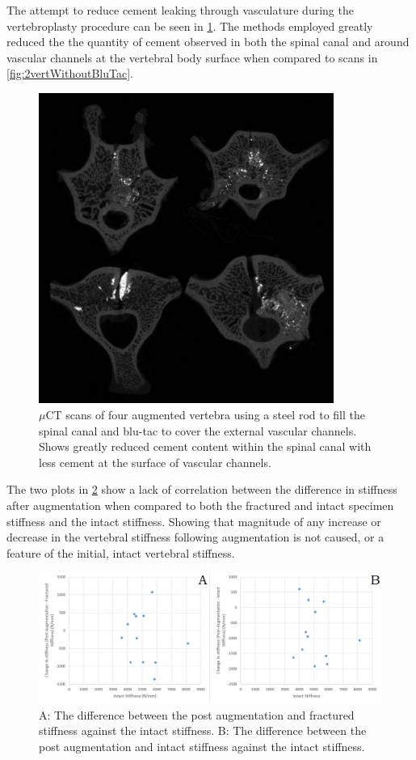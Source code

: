 The attempt to reduce cement leaking through vasculature during the vertebroplasty procedure can be seen in \cref{fig:4vert_withBlutac}. The methods employed greatly reduced the the quantity of cement observed in both the spinal canal and around vascular channels at the vertebral body surface when compared to scans in \cref{fig:2vertWithoutBluTac}.

\begin{figure}[ht!]
\centering
\includegraphics[width=3.8in]{images/4vertPostBluTac.png}
\caption{$\mu$CT scans of four augmented vertebra using a steel rod to fill the spinal canal and blu-tac to cover the external vascular channels. Shows greatly reduced cement content within the spinal canal with less cement at the surface of vascular channels.}
\label{fig:4vert_withBlutac}
\end{figure}


The two plots in \cref{fig:deltaStiffness_Vs_intact} show a lack of correlation between the difference in stiffness after augmentation when compared to both the fractured and intact specimen stiffness and the intact stiffness. Showing that magnitude of any increase or decrease in the vertebral stiffness following augmentation is not caused, or a feature of the initial, intact vertebral stiffness.

\begin{figure}[ht!]
\centering
\includegraphics[width=\textwidth]{images/deltaStiffnessVsIntact.png}
\caption{A: The difference between the post augmentation and fractured stiffness against the intact stiffness. B: The difference between the post augmentation and intact stiffness against the intact stiffness.}
\label{fig:deltaStiffness_Vs_intact}
\end{figure}


